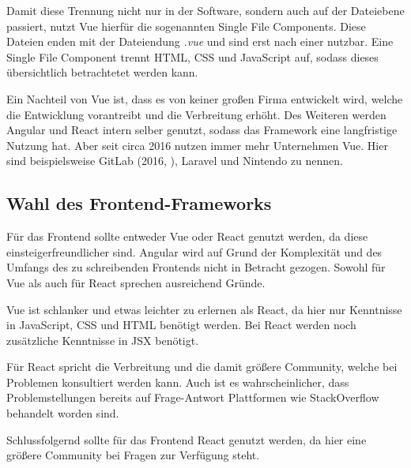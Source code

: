 Damit diese Trennung nicht nur in der Software, sondern auch auf der Dateiebene passiert, nutzt Vue hierfür die sogenannten Single File Components. Diese Dateien enden mit der Dateiendung \textit{.vue} und sind erst nach einer  nutzbar. Eine Single File Component trennt HTML, CSS und JavaScript auf, sodass dieses übersichtlich betrachtetet werden kann. \cite{teufelVueJsTutorial2018a}

Ein Nachteil von Vue ist, dass es von keiner großen Firma entwickelt wird, welche die Entwicklung vorantreibt und die Verbreitung erhöht. Des Weiteren werden Angular und React intern selber genutzt, sodass das Framework eine langfristige Nutzung hat. Aber seit circa 2016 nutzen immer mehr Unternehmen Vue. Hier sind beispielsweise GitLab (2016, \cite{schatzWhyWeChose2016}), Laravel und Nintendo zu nennen. \cite{techuzTopWebsitesBuilt2018}

\subsection{Wahl des Frontend-Frameworks}

Für das Frontend sollte entweder Vue oder React genutzt werden, da diese einsteigerfreundlicher sind. Angular wird auf Grund der Komplexität und des Umfangs des zu schreibenden Frontends nicht in Betracht gezogen. Sowohl für Vue als auch für React sprechen ausreichend Gründe. 

Vue ist schlanker und etwas leichter zu erlernen als React, da hier nur Kenntnisse in JavaScript, CSS und HTML benötigt werden. Bei React werden noch zusätzliche Kenntnisse in JSX benötigt.

Für React spricht die Verbreitung und die damit größere Community, welche bei Problemen konsultiert werden kann. Auch ist es wahrscheinlicher, dass Problemstellungen bereits auf Frage-Antwort Plattformen wie StackOverflow behandelt worden sind. 

Schlussfolgernd sollte für das Frontend React genutzt werden, da hier eine größere Community bei Fragen zur Verfügung steht.
